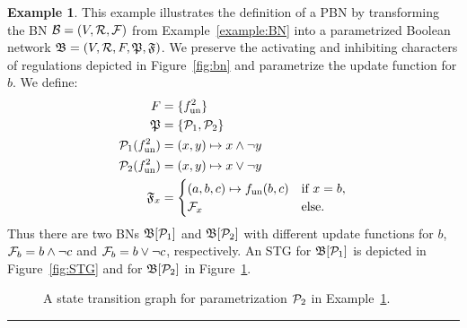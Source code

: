 \documentclass[
	digital, oneside, nosansbold, nocolorbold, nolot, nolof
]{fithesis4}
\theoremstyle{definition}
\theoremstyle{definition}
\newtheorem{example}{Example}
\newenvironment{lexample}
    {\begin{example}}
    {\par\hspace{\stretch{1}}\rule{0.2\textwidth}{0.01ex}\hspace{\stretch{1}}
     \par\end{example}}
\DeclarePairedDelimiter{\set}{\{}{\}}
\begin{document}
\begin{lexample} \label{example:PBN}
This example illustrates the definition of a PBN by transforming the BN
$\mathcal{B} = (V, \mathcal{R}, \mathcal{F})$ from Example~\ref{example:BN} into
a parametrized Boolean network $\mathfrak{B} = (V, \mathcal{R}, F, \mathfrak{P},
\mathfrak{F})$. We preserve the activating and inhibiting characters of
regulations depicted in Figure~\ref{fig:bn} and parametrize the update function
for $b$.  We define:
\begin{align*}
    F & = \set{\unf{f}^2} \\
    \paronset{P} & = \set{\paron{P}_1, \paron{P}_2} \\
    \paron{P}_1(\unf{f}^2) & = (x, y) \mapsto x \land \lnot y \\
    \paron{P}_2(\unf{f}^2) & = (x, y) \mapsto x \lor \lnot y \\
    \PBNUFs{F}_x & =
        \begin{cases}
            (a, b, c) \mapsto \unf{f}(b, c) & \text{if } x = b,\\
            \BNUFs{F}_x & \text{else}.
        \end{cases} \\
\end{align*}
Thus there are two BNs $\mathfrak{B}[\mathcal{P}_1]$ and $\mathfrak{B}[\mathcal{P}_2]$
with different update functions for $b$, $\mathcal{F}_b = b \land \lnot c$
and $\mathcal{F}_b = b \lor \lnot c$, respectively. An STG for
$\mathfrak{B}[\mathcal{P}_1]$ is depicted in Figure~\ref{fig:STG}
and for $\mathfrak{B}[\mathcal{P}_2]$ in Figure~\ref{fig:STG2}.
\begin{figure}[!ht]
\centering
{}
\caption{A state transition graph for parametrization $\mathcal{P}_2$ in
    Example~\ref{example:PBN}.}
\label{fig:STG2}
\end{figure}
\end{lexample}
\end{document}

